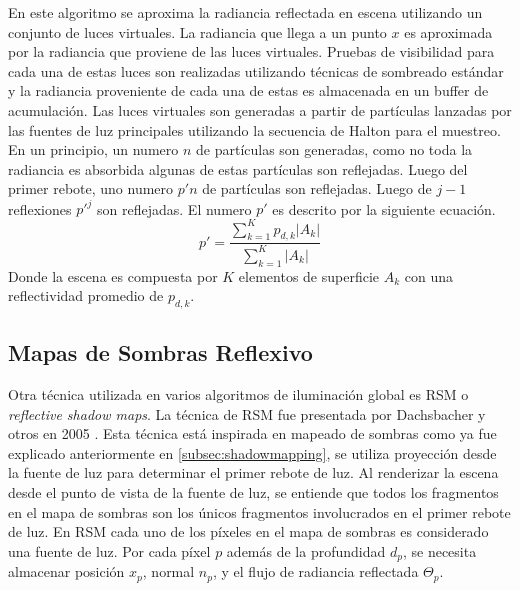 En este algoritmo se aproxima la radiancia reflectada en escena utilizando un conjunto de luces virtuales. La radiancia que llega a un punto $x$ es aproximada por la radiancia que proviene de las luces virtuales. Pruebas de visibilidad para cada una de estas luces son realizadas utilizando técnicas de sombreado estándar y la radiancia proveniente de cada una de estas es almacenada en un buffer de acumulación.
Las luces virtuales son generadas a partir de partículas lanzadas por las fuentes de luz principales utilizando la secuencia de Halton para el muestreo. En un principio, un numero $n$ de partículas son generadas, como no toda la radiancia es absorbida algunas de estas partículas son reflejadas. Luego del primer rebote, uno numero $p'n$ de partículas son reflejadas. Luego de $j-1$ reflexiones $p'^j$ son reflejadas. El numero $p'$ es descrito por la siguiente ecuación.
\begin{equation}
    p' = \frac{\sum_{k=1}^{K} p_{d,k}|A_{k}|}{\sum_{k=1}^{K}|A_{k}|}
    \label{eq:reflected_vpls}
\end{equation}
Donde la escena es compuesta por $K$ elementos de superficie $A_{k}$ con una reflectividad promedio de $p_{d,k}$.

\subsection{Mapas de Sombras Reflexivo}
Otra técnica utilizada en varios algoritmos de iluminación global es \ac{RSM} o \emph{reflective shadow maps}. La técnica de \ac{RSM} fue presentada por Dachsbacher y otros en 2005 \cite{Dachsbacher:2005}.  Esta técnica está inspirada en mapeado de sombras como ya fue explicado anteriormente en \ref{subsec:shadowmapping}, se utiliza proyección desde la fuente de luz para determinar el primer rebote de luz. Al renderizar la escena desde el punto de vista de la fuente de luz, se entiende que todos los fragmentos en el mapa de sombras son los únicos fragmentos involucrados en el primer rebote de luz. En \ac{RSM} cada uno de los píxeles en el mapa de sombras es considerado una fuente de luz. Por cada píxel $p$ además de la profundidad $d_{p}$, se necesita almacenar posición $x_{p}$, normal $n_{p}$, y el flujo de radiancia reflectada $\Theta_{p}$.


